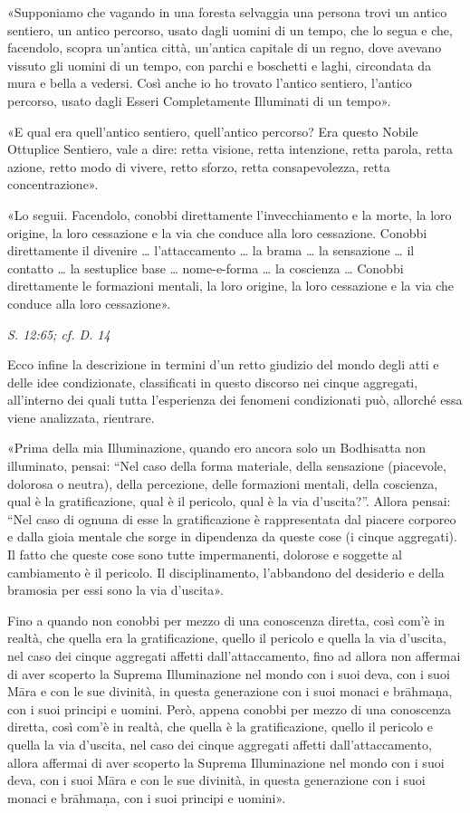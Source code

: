 «Supponiamo che vagando in una foresta selvaggia una persona trovi un
antico sentiero, un antico percorso, usato dagli uomini di un tempo, che
lo segua e che, facendolo, scopra un’antica città, un’antica capitale di
un regno, dove avevano vissuto gli uomini di un tempo, con parchi e
boschetti e laghi, circondata da mura e bella a vedersi. Così anche io
ho trovato l’antico sentiero, l’antico percorso, usato dagli Esseri
Completamente Illuminati di un tempo».


«E qual era quell’antico sentiero, quell’antico percorso? Era questo
Nobile Ottuplice Sentiero, vale a dire: retta visione, retta intenzione,
retta parola, retta azione, retto modo di vivere, retto sforzo, retta
consapevolezza, retta concentrazione».


«Lo seguii. Facendolo, conobbi direttamente l’invecchiamento e la morte,
la loro origine, la loro cessazione e la via che conduce alla loro
cessazione. Conobbi direttamente il divenire …​ l’attaccamento …​ la
brama …​ la sensazione …​ il contatto …​ la sestuplice base …​
nome-e-forma …​ la coscienza …​ Conobbi direttamente le formazioni
mentali, la loro origine, la loro cessazione e la via che conduce alla
loro cessazione».


\emph{S. 12:65; cf. D. 14}


 Ecco infine la descrizione in termini d’un retto
giudizio del mondo degli atti e delle idee condizionate, classificati in
questo discorso nei cinque aggregati, all’interno dei quali tutta
l’esperienza dei fenomeni condizionati può, allorché essa viene
analizzata, rientrare.


 «Prima della mia Illuminazione, quando ero ancora solo un
Bodhisatta non illuminato, pensai: “Nel caso della forma materiale,
della sensazione (piacevole, dolorosa o neutra), della percezione, delle
formazioni mentali, della coscienza, qual è la gratificazione, qual è il
pericolo, qual è la via d’uscita?”. Allora pensai: “Nel caso di ognuna
di esse la gratificazione è rappresentata dal piacere corporeo e dalla
gioia mentale che sorge in dipendenza da queste cose (i cinque
aggregati). Il fatto che queste cose sono tutte impermanenti, dolorose e
soggette al cambiamento è il pericolo. Il disciplinamento, l’abbandono
del desiderio e della bramosia per essi sono la via d’uscita».


Fino a quando non conobbi per mezzo di una conoscenza diretta, così
com’è in realtà, che quella era la gratificazione, quello il pericolo e
quella la via d’uscita, nel caso dei cinque aggregati affetti
dall’attaccamento, fino ad allora non affermai di aver scoperto la
Suprema Illuminazione nel mondo con i suoi deva, con i suoi Māra e con
le sue divinità, in questa generazione con i suoi monaci e brāhmaṇa, con
i suoi principi e uomini. Però, appena conobbi per mezzo di una
conoscenza diretta, così com’è in realtà, che quella è la
gratificazione, quello il pericolo e quella la via d’uscita, nel caso
dei cinque aggregati affetti dall’attaccamento, allora affermai di aver
scoperto la Suprema Illuminazione nel mondo con i suoi deva, con i suoi
Māra e con le sue divinità, in questa generazione con i suoi monaci e
brāhmaṇa, con i suoi principi e uomini».


